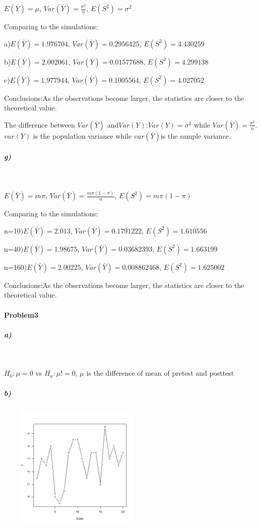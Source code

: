 \documentclass{article}
\begin{document}
$E(\bar{Y})=\mu$,
$Var(\bar{Y})=\frac{\sigma^2}{n}$,
$E(S^2)=\sigma^2$

Comparing to the simulations:

a)$E(\bar{Y})=1.976704$,
$Var(\bar{Y})=0.2956425$,
$E(S^2)=4.430259$

b)$E(\bar{Y})=2.002061$,
$Var(\bar{Y})= 0.01577688$,
$E(S^2)=4.299138$

c)$E(\bar{Y})=1.977944$,
$Var(\bar{Y})=0.1005564$,
$E(S^2)=4.027052$

Conclusions:As the observations become larger, the statistics are closer to the theoretical value.

The difference between $Var(\bar{Y})$ and$Var(Y)$:$Var(Y)=\sigma^2$ while $Var(\bar{Y})=\frac{\sigma^2}{n}$. $var(Y)$ is the population variance while $var(\bar{Y})$is the sample variance.
\subparagraph{g)}~{}

$E(\bar{Y})=m\pi$,
$Var(\bar{Y})=\frac{m\pi(1-\pi)}{n}$,
$E(S^2)=m\pi(1-\pi)$

Comparing to the simulations:

n=10)$E(\bar{Y})=2.013$,
$Var(\bar{Y})=0.1791222$,
$E(S^2)=1.610556$

n=40)$E(\bar{Y})=1.98675$,
$Var(\bar{Y})= 0.03682393$,
$E(S^2)=1.663199$

n=160)$E(\bar{Y})=2.00225$,
$Var(\bar{Y})=0.008862468$,
$E(S^2)=1.625002$

Conclusions:As the observations become larger, the statistics are closer to the theoretical value.
\paragraph{Problem3}
\subparagraph{a)}~{}

$H_0:\mu=0$ vs $H_a:\mu!=0$, $\mu$ is the difference of mean of pretest and posttest
\subparagraph{b)}~{}
\newline
\includegraphics[height=6cm,width=7cm]{3b.jpg}
\end{document}
